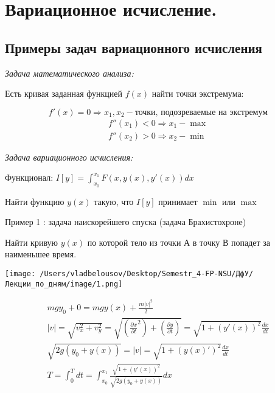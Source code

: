 \documentclass[12pt, a4paper]{report}
\begin{document}
\fi


\chapter{Вариационное исчисление.}

\section{Примеры задач вариационного исчисления}

\textit{Задача математического анализа: } 

Есть кривая заданная функцией \( f(x) \) найти точки экстремума: 

\[  f'(x)=0 \Rightarrow {x_1,x_2}-{\text{точки, подозреваемые на экстремум}  }   \] 
\begin{gather*}
    f''(x_1)<0 \Rightarrow x_1  - \max  \\
    f''(x_2)>0 \Rightarrow x_2 - \min    
\end{gather*}

\textit{Задача вариационного исчисления:} 

Функционал: \( I [y]= \int_{x_0}^{x_1}F(x,y(x),y'(x))dx  \) 

Найти функцию \( y(x) \) такую, что \( I[y] \) принимает \( \min  \) или \( \max  \) 

\begin{flushleft}
    Пример 1 : задача наискорейшего спуска (задача Брахистохроне)
\end{flushleft}

Найти кривую \( y(x) \)  по которой тело из точки А в точку В попадет за наименьшее время. 

\begin{center}
    \texttt{[image: /Users/vladbelousov/Desktop/Semestr\_4-FP-NSU/ДфУ/Лекции\_по\_дням/image/1.png]}
\end{center}

\begin{gather*}
    mgy_0+0= mgy(x)+ \frac{m |v| ^2}{2} \\
    \lvert v  \rvert =\sqrt{v_x ^2 + v_y ^2} = \sqrt{\left( \frac{\partial x}{\partial t} ^2  \right) +\left( \frac{\partial y }{\partial t}  \right) }= \sqrt{1+(y'(x))^2} \frac{dx}{dt} \\
    \sqrt{2g(y_0+ y(x)) }= |v|= \sqrt{1+(y(x)')^2} \frac{dx}{dt} \\
    T= \int_{0}^{T}dt= \int_{x_0 }^{x_1} \frac{\sqrt{1+(y'(x))^2}}{\sqrt{2g(y_0+ y(x)) }} dx   
\end{gather*}
\end{document}

